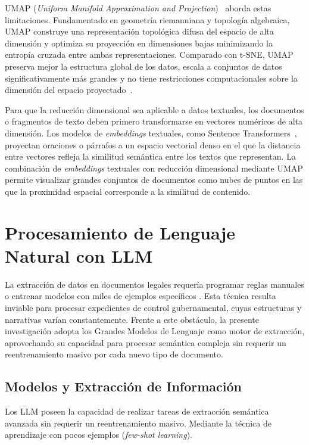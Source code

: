 \acs{UMAP} (\textit{Uniform Manifold Approximation and 
Projection})~\cite{mcinnes2018umap} aborda estas 
limitaciones. Fundamentado en geometría riemanniana 
y topología algebraica, \acs{UMAP} construye una 
representación topológica difusa del espacio de alta 
dimensión y optimiza su proyección en dimensiones 
bajas minimizando la entropía cruzada entre ambas 
representaciones. Comparado con t-SNE, \acs{UMAP} preserva 
mejor la estructura global de los datos, escala a 
conjuntos de datos significativamente más grandes y 
no tiene restricciones computacionales sobre la 
dimensión del espacio 
proyectado~\cite{mcinnes2018umap}.

Para que la reducción dimensional sea aplicable a 
datos textuales, los documentos o fragmentos de texto 
deben primero transformarse en vectores numéricos de 
alta dimensión. Los modelos de 
\textit{embeddings} textuales, como Sentence 
Transformers~\cite{reimers2019sbert}, proyectan 
oraciones o párrafos a un espacio vectorial denso en 
el que la distancia entre vectores refleja la 
similitud semántica entre los textos que representan. 
La combinación de \textit{embeddings} textuales con 
reducción dimensional mediante \acs{UMAP} permite visualizar 
grandes conjuntos de documentos como nubes de puntos 
en las que la proximidad espacial corresponde a la 
similitud de contenido.




\section{Procesamiento de Lenguaje Natural con \texorpdfstring{\acs{LLM}}{LLMs}}
La extracción de datos en documentos legales requería programar reglas manuales o entrenar modelos con miles de ejemplos específicos \cite{zhong-etal-2020-nlp}. Esta técnica resulta inviable para procesar expedientes de control gubernamental, cuyas estructuras y narrativas varían constantemente. Frente a este obstáculo, la presente investigación adopta los Grandes Modelos de Lenguaje como motor de extracción, aprovechando su capacidad para procesar semántica compleja sin requerir un reentrenamiento masivo por cada nuevo tipo de documento.


\subsection{Modelos y Extracción de Información}
Los \acs{LLM} poseen la capacidad de realizar tareas de extracción semántica avanzada sin requerir un reentrenamiento masivo. Mediante la técnica de aprendizaje con pocos ejemplos (\textit{few-shot learning})\cite{brown2020}. 

